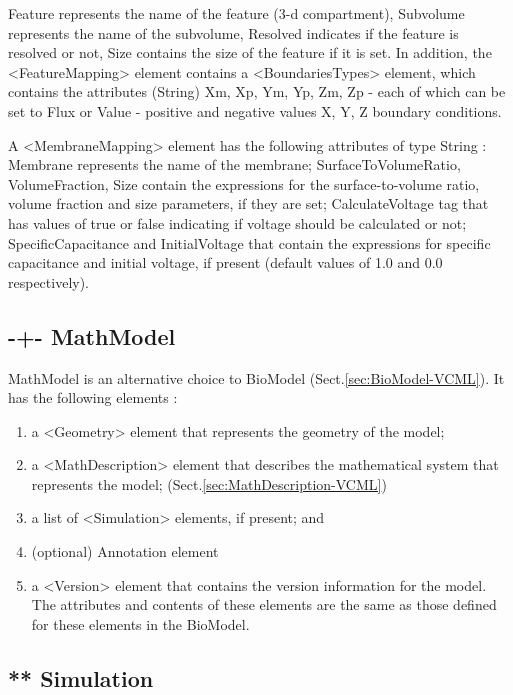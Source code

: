 Feature represents the name of the feature (3-d compartment), Subvolume
represents the name of the subvolume, Resolved indicates if the feature is
resolved or not, Size contains the size of the feature if it is set. In
addition, the <FeatureMapping> element contains a <BoundariesTypes> element,
which contains the attributes (String) Xm, Xp, Ym, Yp, Zm, Zp - each of which
can be set to Flux or Value - positive and negative values X, Y, Z boundary
conditions.


A <MembraneMapping> element has the following attributes of type String :
Membrane represents the name of the membrane; SurfaceToVolumeRatio,
VolumeFraction, Size contain the expressions for the surface-to-volume ratio,
volume fraction and size parameters, if they are set; CalculateVoltage tag that
has values of true or false indicating if voltage should be calculated or not;
SpecificCapacitance and InitialVoltage that contain the expressions for specific
capacitance and initial voltage, if present (default values of 1.0 and 0.0
respectively).


\subsection{-+- MathModel}
\label{sec:MathModel-VCML}

MathModel is an alternative choice to BioModel (Sect.\ref{sec:BioModel-VCML}).
It has the following elements : 
\begin{enumerate}
  \item  a <Geometry> element that represents the
geometry of the model; 

  \item a <MathDescription> element that describes the mathematical system that
represents the model; (Sect.\ref{sec:MathDescription-VCML})

  \item a list of <Simulation> elements, if present; and 
  
  \item (optional) Annotation element
  
  \item a <Version> element that contains the version information for the model.
  The attributes and contents of these elements are the same as those defined
  for these elements in the BioModel.
  
\end{enumerate}


\subsection{** Simulation}
\label{sec:Simulation-VCML}

